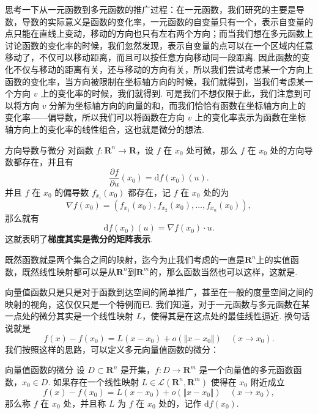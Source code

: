 思考一下从一元函数到多元函数的推广过程：在一元函数，我们研究的主要是导数，导数的实际意义是函数的变化率，一元函数的自变量只有一个，表示自变量的点只能在直线上变动，移动的方向也只有左右两个方向；而当我们想在多元函数上讨论函数的变化率的时候，我们忽然发现，表示自变量的点可以在一个区域内任意移动了，不仅可以移动距离，而且可以按任意方向移动同一段距离. 因此函数的变化不仅与移动的距离有关，还与移动的方向有关，所以我们尝试考虑某一个方向上函数的变化率，当方向被限制在坐标轴方向的时候，我们就得到，当我们考虑某一个方向 $v$ 上的变化率的时候，我们就得到. 可是我们不想仅限于此，我们注意到可以将方向 $v$ 分解为坐标轴方向的向量的和，而我们恰恰有函数在坐标轴方向上的变化率——偏导数，所以我们可以将函数在方向 $v$ 上的变化率表示为函数在坐标轴方向上的变化率的线性组合，这也就是微分的想法.

\begin{theorem}{方向导数与微分}{}
    对函数 $f\colon \mathbf{R}^n\to \mathbf{R}$，设 $f$ 在 $x_0$ 处可微，那么 $f$ 在 $x_0$ 处的方向导数都存在，并且有\[\frac{\partial f}{\partial u}(x_0) = \mathrm{d}f(x_0)(u).\]
    并且 $f$ 在 $x_0$ 的偏导数 $f_{x_i}(x_0)$ 都存在，记 $f$ 在 $x_0$ 处的为 \[\nabla f(x_0) = (f_{x_1}(x_0), f_{x_2}(x_0), \ldots, f_{x_n}(x_0)),\]
    那么就有 \[\mathrm{d}f(x_0)(u) = \nabla f(x_0)\cdot u.\]这就表明了\textbf{梯度其实是微分的矩阵表示}.
\end{theorem}

既然函数就是两个集合之间的映射，迄今为止我们考虑的一直是$\mathbf{R}^n$上的实值函数，既然线性映射都可以是从$\mathbf{R}^n$到$\mathbf{R}^m$的，那么函数当然也可以这样，这就是.

向量值函数只是只是对于函数到达空间的简单推广，甚至在一般的度量空间之间的映射的视角，这仅仅只是一个特例而已. 我们知道，对于一元函数与多元函数在某一点处的微分其实是一个线性映射 $L$，使得其是在这点处的最佳线性逼近. 换句话说就是\[f(x) - f(x_0) = L(x-x_0) + o(\Vert x-x_0\Vert)\quad (x\to x_0).\]我们按照这样的思路，可以定义多元向量值函数的微分：

\begin{definition}{向量值函数的微分}{}
    设 $D\subset\mathbf{R}^n$ 是开集，$f\colon D\to\mathbf{R}^m$ 是一个向量值的多元函数函数，$x_0\in D$. 如果存在一个线性映射 $L\in \mathcal{L}(\mathbf{R}^n, \mathbf{R}^m)$ 使得在 $x_0$ 附近成立\[f(x) - f(x_0) = L(x-x_0) + o(\Vert x-x_0\Vert)\quad (x\to x_0),\]那么称 $f$ 在 $x_0$ 处，并且称 $L$ 为 $f$ 在 $x_0$ 处的，记作 $\mathrm{d}f(x_0)$.
\end{definition}

